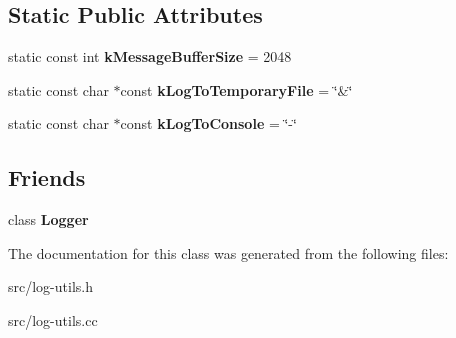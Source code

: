 \subsection*{Static Public Attributes}
\begin{DoxyCompactItemize}
\item 
\hypertarget{classv8_1_1internal_1_1_log_a533184192668b0b2d4b7a241e8eb28ec}{}static const int {\bfseries k\+Message\+Buffer\+Size} = 2048\label{classv8_1_1internal_1_1_log_a533184192668b0b2d4b7a241e8eb28ec}

\item 
\hypertarget{classv8_1_1internal_1_1_log_a89565991012a486da0e90f15a749c3d3}{}static const char $\ast$const {\bfseries k\+Log\+To\+Temporary\+File} = \char`\"{}\&\char`\"{}\label{classv8_1_1internal_1_1_log_a89565991012a486da0e90f15a749c3d3}

\item 
\hypertarget{classv8_1_1internal_1_1_log_a92f1f316f4e0eb7ae4e05cb420f9af50}{}static const char $\ast$const {\bfseries k\+Log\+To\+Console} = \char`\"{}-\/\char`\"{}\label{classv8_1_1internal_1_1_log_a92f1f316f4e0eb7ae4e05cb420f9af50}

\end{DoxyCompactItemize}
\subsection*{Friends}
\begin{DoxyCompactItemize}
\item 
\hypertarget{classv8_1_1internal_1_1_log_aff02b76416d2846736b7ecd798921a0a}{}class {\bfseries Logger}\label{classv8_1_1internal_1_1_log_aff02b76416d2846736b7ecd798921a0a}

\end{DoxyCompactItemize}


The documentation for this class was generated from the following files\+:\begin{DoxyCompactItemize}
\item 
src/log-\/utils.\+h\item 
src/log-\/utils.\+cc\end{DoxyCompactItemize}
